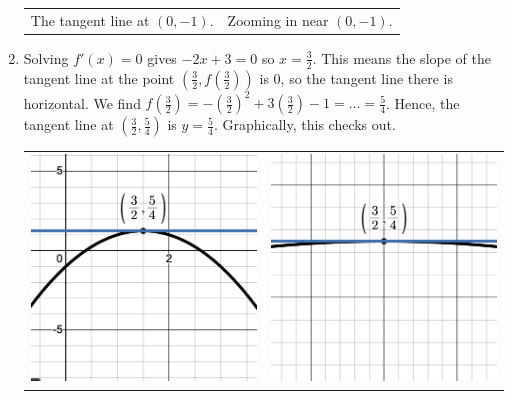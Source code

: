 \documentclass{ximera}
\begin{document}
\begin{example}
\begin{enumerate}
\begin{center}
\begin{tabular}{cc}
 The tangent line at $(0,-1)$. & Zooming in near $(0, -1)$.  \\
 
 \end{tabular}
 
 \end{center}
 
 \item  Solving $f'(x) = 0$ gives $-2x+3 = 0$ so $x = \frac{3}{2}$.  This means the slope of the tangent line at the point $\left(\frac{3}{2}, f\left(\frac{3}{2}\right) \right)$ is $0$, so the tangent line there is horizontal.  We find 
 $f\left(\frac{3}{2}\right) = -\left( \frac{3}{2}\right)^2 + 3\left(\frac{3}{2}\right) - 1 = \ldots = \frac{5}{4}$.  Hence, the tangent line at  $\left(\frac{3}{2}, \frac{5}{4} \right)$ is $y = \frac{5}{4}$.  Graphically, this checks out.
 
 
 
\begin{center}

\begin{tabular}{cc}

 \includegraphics[width=3in]{./IntroductiontoDerivativesGraphics/HTL.png} &  \includegraphics[width=3in]{./IntroductiontoDerivativesGraphics/HTLZoom.png}  \\
 

\end{tabular}
\end{center}
\end{enumerate}
\end{example}
\end{document}

